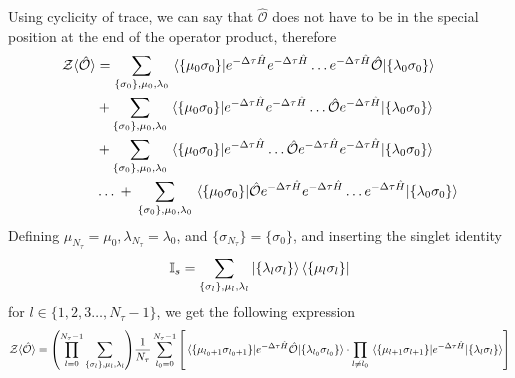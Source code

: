 \documentclass[../journal_main.tex]{subfiles}
\begin{document}
Using cyclicity of trace, we can say that $\hat{\mathcal{O}}$ does not have to be in the special position at the end of the operator product, therefore
\begin{align*}
    \mathcal{Z} \langle {\hat{\mathcal{O}}} \rangle & = \sum_{\{\sigma_0 \}, \mu_0, \lambda_0} \mel{\{\mu_0 \sigma _0\}}{e^{-\Delta \tau \hat{H}} e^{-\Delta \tau \hat{H}} \ldots e^{-\Delta \tau \hat{H}} \hat{\mathcal{O}}}{\{\lambda_0 \sigma _0\}} \\
    & + \sum_{\{\sigma_0 \}, \mu_0, \lambda_0} \mel{\{\mu_0 \sigma _0\}}{e^{-\Delta \tau \hat{H}} e^{-\Delta \tau \hat{H}} \ldots \hat{\mathcal{O}} e^{-\Delta \tau \hat{H}} }{\{\lambda_0 \sigma _0\}} \\
    & + \sum_{\{\sigma_0 \}, \mu_0, \lambda_0} \mel{\{\mu_0 \sigma _0\}}{e^{-\Delta \tau \hat{H}} \ldots \hat{\mathcal{O}} e^{-\Delta \tau \hat{H}} e^{-\Delta \tau \hat{H}} }{\{\lambda_0 \sigma _0\}} \\
    & \ldots  \: + \: \sum_{\{\sigma_0 \}, \mu_0, \lambda_0} \mel{\{\mu_0 \sigma _0\}}{\hat{\mathcal{O}} e^{-\Delta \tau \hat{H}} e^{-\Delta \tau \hat{H}} \ldots e^{-\Delta \tau \hat{H}}}{\{\lambda_0 \sigma _0\}}
\end{align*}
Defining $\mu_{N_\tau} = \mu_0, \lambda _{N_\tau} = \lambda _0$, and $\{\sigma_{N_\tau}\} = \{\sigma_0\}$, and inserting the singlet identity 
\[
    \mathbb{I}_s = \sum_{\{\sigma_l \}, \mu_l, \lambda_l} \ket{\{\lambda_{l} \sigma_{l}\}}\bra{\{\mu_{l} \sigma_{l}\}}
\] 
for $l \in \{1, 2, 3 \ldots, N_\tau - 1\}$, we get the following expression 
\begin{align}
    \mathcal{Z} \langle \hat{\mathcal{O}} \rangle = \qty(\prod_{l=0}^{N_\tau - 1} \sum_{\{\sigma_l \}, \mu_l, \lambda_l}) \frac{1}{N_\tau} \sum_{l_0 = 0}^{N_\tau - 1} \qty[\mel{\{\mu_{l_0+1} \sigma _{l_0+1}\}}{e^{-\Delta \tau \hat{H}} \hat{\mathcal{O}}}{\{\lambda_{l_0} \sigma _{l_0}\}} \cdot \prod_{l \neq l_0} \mel{\{\mu_{l+1} \sigma _{l+1}\}}{e^{-\Delta \tau \hat{H}}}{\{\lambda_{l} \sigma _{l}\}} ] 
    \label{generalop}
\end{align} 
\end{document}
